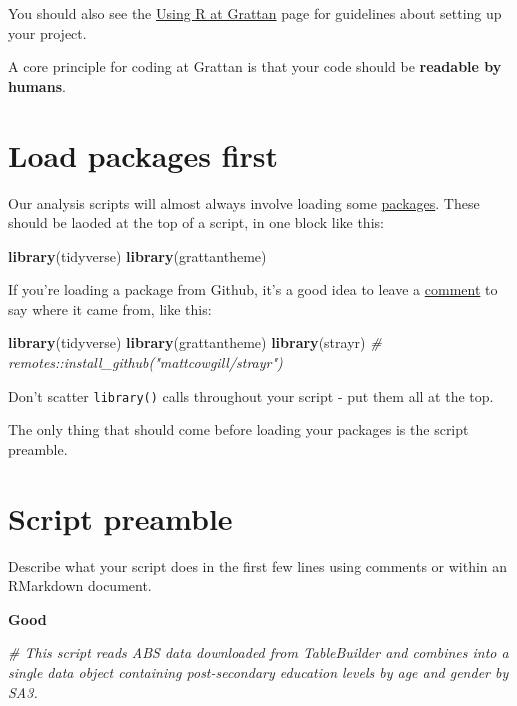 \documentclass[
]{book}
\newenvironment{Shaded}{\begin{snugshade}}{\end{snugshade}}
\newcommand{\CommentTok}[1]{\textcolor[rgb]{0.56,0.35,0.01}{\textit{#1}}}
\newcommand{\KeywordTok}[1]{\textcolor[rgb]{0.13,0.29,0.53}{\textbf{#1}}}
\newcommand{\NormalTok}[1]{#1}
\begin{document}
You should also see the \protect\hyperlink{organising-projects}{Using R at Grattan} page for guidelines about setting up your project.

A core principle for coding at Grattan is that your code should be \textbf{readable by humans}.

\hypertarget{load-packages-first}{%
\section{Load packages first}\label{load-packages-first}}

Our analysis scripts will almost always involve loading some \protect\hyperlink{packages}{packages}. These should be laoded at the top of a script, in one block like this:

\begin{Shaded}
\begin{Highlighting}[]
\KeywordTok{library}\NormalTok{(tidyverse)}
\KeywordTok{library}\NormalTok{(grattantheme)}
\end{Highlighting}
\end{Shaded}

If you're loading a package from Github, it's a good idea to leave a \protect\hyperlink{use-comments}{comment} to say where it came from, like this:

\begin{Shaded}
\begin{Highlighting}[]
\KeywordTok{library}\NormalTok{(tidyverse)}
\KeywordTok{library}\NormalTok{(grattantheme)}
\KeywordTok{library}\NormalTok{(strayr) }\CommentTok{\# remotes::install\_github("mattcowgill/strayr")}
\end{Highlighting}
\end{Shaded}

Don't scatter \texttt{library()} calls throughout your script - put them all at the top.

The only thing that should come before loading your packages is the script preamble.

\hypertarget{script-preamble}{%
\section{Script preamble}\label{script-preamble}}

Describe what your script does in the first few lines using comments or within an RMarkdown document.

\textbf{Good}

\begin{Shaded}
\begin{Highlighting}[]
\CommentTok{\# This script reads ABS data downloaded from TableBuilder and combines into a single data object containing post{-}secondary education levels by age and gender by SA3. }
\end{Highlighting}
\end{Shaded}
\end{document}
